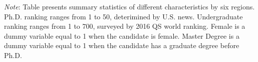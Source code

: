 \begin{table}[H]

\caption{Characteristics of Candidates from Different Regions.}
\centering
\fontsize{8}{10}\selectfont
{}
\vspace*{0.09cm}
\begin{minipage}{0.95\textwidth} 
{\footnotesize 
\textit{Note}: Table presents summary statistics of different characteristics by six regions. Ph.D. ranking ranges from 1 to 50, deterimined by U.S. news. Undergraduate ranking ranges from 1 to 700, surveyed by 2016 QS world ranking. Female is a dummy variable equal to 1 when the candidate is female. Master Degree is a dummy variable equal to 1 when the candidate has a graduate degree before Ph.D.}
\end{minipage}
\end{table}

